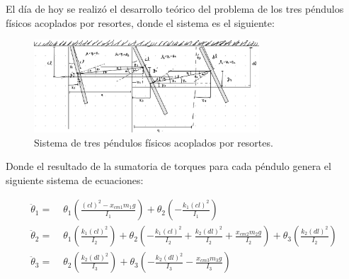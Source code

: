 El día de hoy se realizó el desarrollo teórico del problema de los tres péndulos físicos acoplados por resortes, donde el sistema es el siguiente:

\begin{figure}[h!]
    \hspace{3.5cm} %
    \includegraphics[width=0.75\textwidth, keepaspectratio]{Figures/IM1.jpeg}
    \caption{Sistema de tres péndulos físicos acoplados por resortes.}
    \label{fig:sistema_pendulos}
\end{figure}


Donde el resultado de la sumatoria de torques para cada péndulo genera el siguiente sistema de ecuaciones:

\begin{equation}
\begin{aligned}
  \ddot{\theta}_1 =\; & \theta_1 \left( \frac{(cl)^2 - x_{cm1} m_1 g}{I_1} \right) + \theta_2 \left( -\frac{k_1 (cl)^2}{I_1} \right) \\
  \ddot{\theta}_2 =\; & \theta_1 \left( \frac{k_1 (cl)^2}{I_2} \right) + \theta_2 \left( -\frac{k_1 (cl)^2}{I_2} + \frac{k_2 (dl)^2}{I_2} + \frac{x_{cm2} m_2 g}{I_2} \right) + \theta_3 \left( \frac{k_2 (dl)^2}{I_2} \right) \\
  \ddot{\theta}_3 =\; & \theta_2 \left( \frac{k_2 (dl)^2}{I_3} \right) + \theta_3 \left( -\frac{k_2 (dl)^2}{I_3} - \frac{x_{cm3} m_3 g}{I_3} \right)
\end{aligned}
\end{equation}